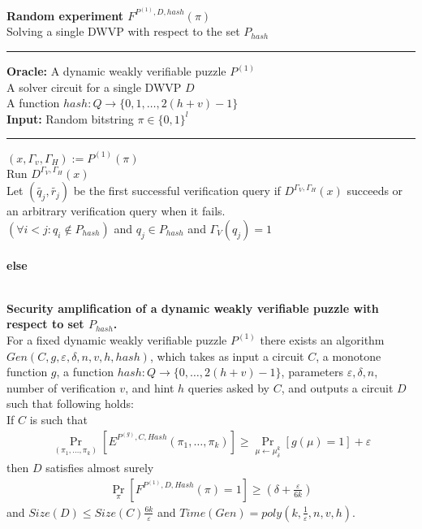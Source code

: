 %
\begin{codeblock}
  \textbf{Random experiment $F^{P^{(1)}, D, hash}(\pi)$} \\
  Solving a single DWVP with respect to the set $P_{hash}$
  \medskip

  \hrule

  \medskip

  \textbf{Oracle:}
  A dynamic weakly verifiable puzzle $P^{(1)}$ \\
  \IndI A solver circuit for a single DWVP $D$ \\
  \IndI A function $hash: Q \rightarrow \{0,1,\dots, 2(h+v)-1\}$ \\ 
  \textbf{Input:} Random bitstring $\pi \in \{0,1\}^l$
  \medskip\hrule\medskip

  $(x, \Gamma_v, \Gamma_H) := P^{(1)}(\pi)$ \\
  Run $D^{\Gamma_V, \Gamma_H}(x)$ \\
  \IndI Let $(\widetilde{q_j},\widetilde{r_j})$ be the first successful verification query if $D^{\Gamma_V, \Gamma_H}(x)$ succeeds or \\
  \IndI an arbitrary verification query when it fails. \\
  \If $(\forall i < j :  q_i \notin  P_{hash} )$ and $q_j \in P_{hash}$ and $\Gamma_V(q_j) = 1$ \then \\
  \IndI {} \\
  \textbf{else}\\
  \IndI {}\\

\end{codeblock}
%
%
\begin{lemma}\textbf{Security amplification of a dynamic weakly verifiable puzzle with respect to set $P_{hash}$.} \\
  For a fixed dynamic weakly verifiable puzzle $P^{(1)}$ there exists an algorithm\\
  $Gen(C, g, \varepsilon, \delta, n, v, h, hash)$, which takes as input a circuit $C$, a monotone function $g$,
  a function $hash : Q \rightarrow \{0, \dots, 2(h+v)-1\}$, parameters $\varepsilon, \delta, n$,
  number of verification $v$, and hint $h$ queries asked by $C$, and outputs a circuit $D$
  such that following holds: \\
  If $C$ is such that \\
  \begin{align*}
    \underset{(\pi_1, \dots, \pi_k)}{\Pr}[E^{P^{(g)}, C, Hash}(\pi_1, \dots, \pi_k)] \geq \underset{\mu \leftarrow \mu_\delta^k}{\Pr}[g(\mu) = 1] + \varepsilon
  \end{align*}
  then $D$ satisfies almost surely
  \begin{align*}
    \underset{\pi}{\Pr}[F^{P^{(1)},D, Hash}(\pi) = 1] \geq (\delta + \frac{\varepsilon}{6k})
  \end{align*}
  and $Size(D) \leq Size(C)\frac{6k}{\varepsilon}$ and $Time(Gen) = poly(k, \frac{1}{\varepsilon}, n, v, h)$.
\end{lemma}

